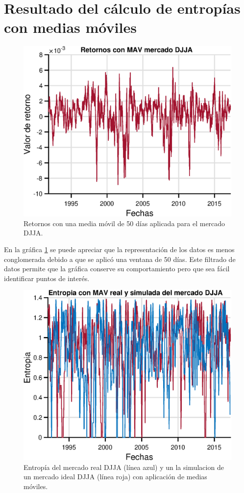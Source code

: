 \section{Resultado del cálculo de entropías con medias móviles}



\begin{figure}[h]
	\centering
	\includegraphics[width=0.7\linewidth]{figures/MAVreturnseps}
	\caption{Retornos con una media móvil de 50 días aplicada para el mercado DJJA.}
	\label{fig:mavreturnseps}
\end{figure}

En la gráfica \ref{fig:mavreturnseps} se puede apreciar que la representación de los datos es menos conglomerada debido a que se aplicó una ventana de 50 días. Este filtrado de datos permite que la gráfica conserve su comportamiento pero que sea fácil identificar puntos de interés.

\begin{figure}[h]
	\centering
	\includegraphics[width=0.7\linewidth]{figures/MAVentropy}
	\caption{Entropía del mercado real DJJA (línea azul) y un la simulacion de un mercado ideal DJJA (línea roja) con aplicación de medias móviles.}
	\label{fig:maventropy}
\end{figure}

